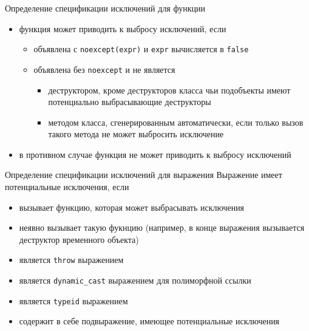 \documentclass[unknownkeysallowed,xcolor=table]{beamer}
\begin{document}
\begin{frame}{Определение спецификации исключений для функции}
  \begin{itemize}
    \item функция может приводить к выбросу исключений, если
      \begin{itemize}
        \item объявлена с \lstinline{noexcept(expr)} и \lstinline{expr} вычисляется в \lstinline{false}
        \item объявлена без \lstinline{noexcept} и не является
          \begin{itemize}
            \item деструктором, кроме деструкторов класса чьи подобъекты имеют потенциально выбрасывающие деструкторы
            \item методом класса, сгенерированным автоматически, если только вызов такого метода не может выбросить исключение
          \end{itemize}
      \end{itemize}
    \item в противном случае функция не может приводить к выбросу исключений
  \end{itemize}
\end{frame}

\begin{frame}{Определение спецификации исключений для выражения}
  Выражение имеет потенциальные исключения, если
  \begin{itemize}
    \item вызывает функцию, которая может выбрасывать исключения \vspace{0.5em}
    \item неявно вызывает такую фукнцию (например, в конце выражения вызывается деструктор временного объекта) \vspace{0.5em}
    \item является \lstinline{throw} выражением \vspace{0.5em}
    \item является \lstinline{dynamic_cast} выражением для полиморфной ссылки \vspace{0.5em}
    \item является \lstinline{typeid} выражением \vspace{0.5em}
    \item содержит в себе подвыражение, имеющее потенциальные исключения
  \end{itemize}
\end{frame}
\end{document}
